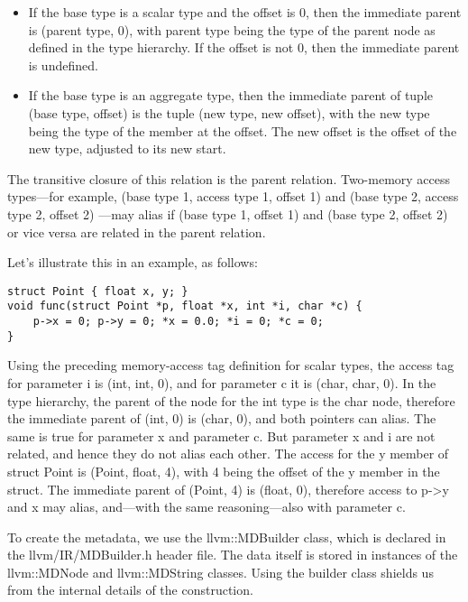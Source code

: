 \begin{itemize}
	\item If the base type is a scalar type and the offset is 0, then the immediate parent is (parent type, 0), with parent type being the type of the parent node as defined in the type hierarchy. If the offset is not 0, then the immediate parent is undefined.
	\item If the base type is an aggregate type, then the immediate parent of tuple (base type, offset) is the tuple (new type, new offset), with the new type being the type of the member at the offset. The new offset is the offset of the new type, adjusted to its new start.
\end{itemize}

The transitive closure of this relation is the parent relation. Two-memory access types—for example, (base type 1, access type 1, offset 1) and (base type 2, access type 2, offset 2) —may alias if (base type 1, offset 1) and (base type 2, offset 2) or vice versa are related in the parent relation.\par

Let's illustrate this in an example, as follows:\par

\begin{lstlisting}[caption={}]
struct Point { float x, y; }
void func(struct Point *p, float *x, int *i, char *c) {
	p->x = 0; p->y = 0; *x = 0.0; *i = 0; *c = 0; 
}
\end{lstlisting}

Using the preceding memory-access tag definition for scalar types, the access tag for parameter i is (int, int, 0), and for parameter c it is (char, char, 0). In the type hierarchy, the parent of the node for the int type is the char node, therefore the immediate parent of (int, 0) is (char, 0), and both pointers can alias. The same is true for parameter x and parameter c. But parameter x and i are not related, and hence they do not alias each other. The access for the y member of struct Point is (Point, float, 4), with 4 being the offset of the y member in the struct. The immediate parent of (Point, 4) is (float, 0), therefore access to p->y and x may alias, and—with the same reasoning—also with parameter c.\par

To create the metadata, we use the llvm::MDBuilder class, which is declared in the llvm/IR/MDBuilder.h header file. The data itself is stored in instances of the llvm::MDNode and llvm::MDString classes. Using the builder class shields us from the internal details of the construction.\par

